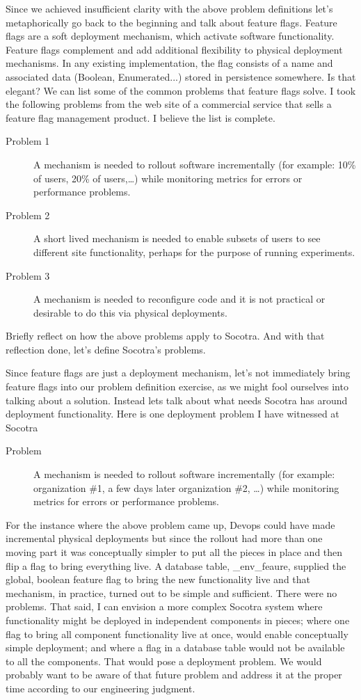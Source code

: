 Since we achieved insufficient clarity with the above problem definitions let's metaphorically go back to the beginning and talk about feature
flags. Feature flags are a soft deployment mechanism, which activate software functionality. Feature flags complement and add additional
flexibility to physical deployment mechanisms. In any existing implementation, the flag consists of a name and associated data (Boolean,
Enumerated...) stored in persistence somewhere. Is that elegant? We can list some of the common problems that feature flags solve. I took
the following problems from the web site of a commercial service that sells a feature flag management product. I believe the list is complete.

\begin{description}
  \item[Problem 1] A mechanism is needed to rollout software incrementally (for example: 10\% of users, 20\% of users,\dots) while monitoring
  metrics for errors or performance problems.
  \item[Problem 2] A short lived mechanism is needed to enable subsets of users to see different site functionality, perhaps for the purpose of
  running experiments.
  \item[Problem 3] A mechanism is needed to reconfigure code and it is not practical or desirable to do this via physical deployments.
\end{description}
Briefly reflect on how the above problems apply to Socotra. And with that reflection done, let's define Socotra's
problems.

Since feature flags are just a deployment mechanism, let's not immediately bring feature flags into our problem definition exercise, as we might
fool ourselves into
talking about a solution. Instead lets talk about what needs Socotra has around deployment functionality. Here is one deployment problem I
have witnessed at Socotra
\begin{description}
  \item[Problem] A mechanism is needed to rollout software incrementally (for example: organization \#1, a few days later organization \#2, \dots) while monitoring
  metrics for errors or performance problems.
\end{description}
For the instance where the above problem came up, Devops could have made incremental physical deployments but since the rollout had
more than one moving part it was conceptually simpler to put all the pieces in place and then flip a flag to bring everything live.
A database table, \_env\_feaure, supplied the global, boolean feature flag to bring the new functionality live and that mechanism, in practice, turned out to be
simple and sufficient. There were no problems. That said, I can envision a more complex Socotra system where functionality might be
deployed in independent components in pieces; where one flag to bring all component functionality live at once, would enable conceptually simple deployment;
and where a flag in a database table would not be available to all the components. That would pose a deployment problem. We would probably
want to be aware of that future problem and address it at the proper time according to our engineering judgment.

